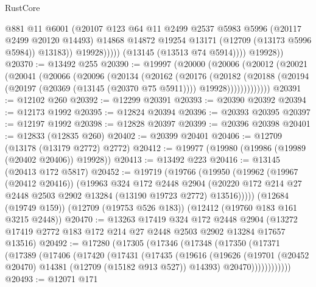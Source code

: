 \begin{lexlean}{RustCore}
\begin{coremodule}
                        @881
                        @11
                        @6001
                        (@20107
                          @123
                          @64
                          @11
                          @2499
                          @2537
                          @5983
                          @5996
                          (@20117 @2499 @20120 @14493)
                          @14868
                          @14872
                          @19254
                          @13171
                          (@12709 (@13173 @5996 @5984))
                          @13183))
                      @19928)))))
            (@13145 (@13513 @74 @5914))))
        @19928))
@20370 := @13492 @255
@20390 := @19997
    (@20000
      (@20006
        (@20012
          (@20021
            (@20041
              (@20066
                (@20096
                  (@20134
                    (@20162
                      (@20176
                        (@20182
                          (@20188
                            (@20194
                              (@20197 (@20369 (@13145 (@20370 @75 @5911))))
                              @19928)))))))))))))
@20391 := @12102 @260
@20392 := @12299 @20391
@20393 := @20390 @20392
@20394 := @12173 @1992
@20395 := @12824 @20394
@20396 := @20393 @20395
@20397 := @12197 @1992
@20398 := @12828 @20397
@20399 := @20396 @20398
@20401 := @12833 (@12835 @260)
@20402 := @20399 @20401
@20406 := @12709 (@13178 (@13179 @2772) @2772)
@20412 := @19977 (@19980 (@19986 (@19989 (@20402 @20406)) @19928))
@20413 := @13492 @223
@20416 := @13145 (@20413 @172 @5817)
@20452 := @19719
    (@19766
      (@19950
        (@19962
          (@19967 (@20412 @20416))
          (@19963
            @324
            @172
            @2448
            @2904
            (@20220 @172 @214 @27 @2448 @2503 @2902 @13284 (@13190 @19723 @2772) @13516)))))
    (@12684 (@19749 @159))
    (@12709 (@19753 @526 @183))
    (@12412 (@19760 @183 @161 @3215 @2448))
@20470 := @13263
    @17419
    @324
    @172
    @2448
    @2904
    (@13272 @17419 @2772 @183 @172 @214 @27 @2448 @2503 @2902 @13284 @17657 @13516)
@20492 := @17280
    (@17305
      (@17346
        (@17348
          (@17350
            (@17371
              (@17389
                (@17406
                  (@17420
                    (@17431
                      (@17435
                        (@19616
                          (@19626
                            (@19701 (@20452 @20470) @14381 (@12709 (@15182 @913 @527)) @14393)
                            @20470))))))))))))
@20493 := @12071 @171

\end{coremodule}
\end{lexlean}

